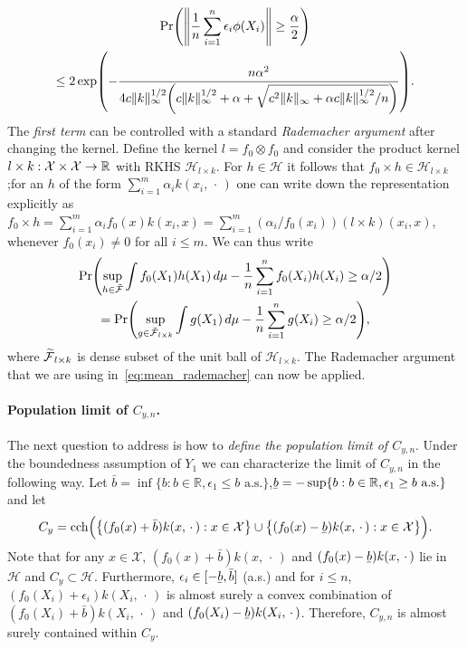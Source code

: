 \documentclass[10pt]{amsart}
\theoremstyle{definition}\newtheorem{defi}[theo]{Definition}\newtheorem{rema}[theo]{Remark}\newtheorem{exam}[theo]{Example}\newtheorem{exem}[theo]{Example}\newtheorem{nota}[theo]{Notation}
\theoremstyle{remark}
\DeclareMathOperator{\cch}{cch}
\newcommand{\R}{\mathbb{R}}
\newcommand{\X}{\mathcal{X}}
\newcommand{\cH}{\mathcal{H}}
\newcommand{\clF}{\mathcal{F}}
\newcommand{\ubar}[1]{\underaccent{\bar}{#1}}
\let\oldtilde\tilde
\renewcommand*{\tilde}[1]{\mathchoice{\widetilde{#1}}{\widetilde{#1}}{\oldtilde{#1}}{\oldtilde{#1}}}
\renewcommand*{\to}{\mathchoice{\longrightarrow}{\rightarrow}{\rightarrow}{\rightarrow}}
\let\originalleft\left
\let\originalright\right
\renewcommand{\left}{\mathopen{}\mathclose\bgroup\originalleft}
\renewcommand{\right}{\aftergroup\egroup\originalright}
\begin{document}
\begin{multline}\label{eq:bernstein_phi}
\Pr\left(\left \| \frac{1}{n} \sum_{i=1}^n \epsilon_i \phi(X_i) \right\|
\geq \frac{\alpha}{2} \right)\\ \leq 2 \exp\left(-\frac{n \alpha^2}{4 c \|k\|^{1/2}_\infty \left(c \|k\|^{1/2}_\infty +\alpha + \sqrt{c^2 \|k\|_\infty + \alpha c \|k\|^{1/2}_\infty /n}\right)}
\right).
\end{multline}
The \emph{first term} can be controlled with a standard \emph{Rademacher argument} after changing the kernel. Define the kernel $l = f_0 \otimes f_0$ and consider the product kernel $l \times k : \X \times \X \to \R$ with RKHS $\cH_{l \times k}$. For $h\in \cH$ it follows that $f_0 \times h \in \cH_{l \times k}$;\linebreak for an $h$ of the form $\sum_{i=1}^m \alpha_i k(x_i,\,\cdot\,)$ one can write down the representation explicitly as $f_0 \times h = \sum_{i=1}^m \alpha_i f_0(x) k(x_i,x) = \sum_{i=1}^m (\alpha_i/f_0(x_i)) (l \times k)(x_i,x)$, whenever $f_0(x_i) \not = 0$ for all $i\leq m$. We can thus write
\begin{multline}\label{eq:mean_y_n_vs_y_second}
\Pr\left(\sup_{h \in \tilde{\clF}} \int f_0(X_1) h(X_1) \, d\mu - \frac{1}{n} \sum_{i=1}^n f_0(X_i) h(X_i) \geq \alpha/2\right)\\
= \Pr\left(\sup_{g \in \tilde{\clF}_{l\times k}} \int g(X_1) \, d\mu - \frac{1}{n} \sum_{i=1}^n g(X_i) \geq \alpha/2\right),
\end{multline}
where $\tilde{\clF}_{l\times k}$ is dense subset of the unit ball of $\cH_{l \times k}$. The Rademacher argument that we are using in~\eqref{eq:mean_rademacher} can now be applied.


\paragraph{Population limit of $C_{y,n}$.} The next question to address is how to \emph{define the population limit of $C_{y,n}$}. Under the boundedness assumption of $Y_1$ we can characterize the limit of $C_{y,n}$ in the following way. Let $\bar b = \inf\{b : b \in \R, \epsilon_1 \leq b \text{ a.s.} \}$,\linebreak $\ubar{b} = - \sup\{b : b \in \R, \epsilon_1 \geq b \text{ a.s.} \}$ and let
\[
C_y = \cch\Bigl(\bigl\{ (f_0(x) + \bar b) k(x,\,\cdot\,) : x \in \X \bigr\} \cup \bigl\{ (f_0(x) - \ubar b) k(x,\,\cdot\,) : x \in \X \bigr\}\Bigr).
\]
Note that for any $x\in \X$, $(f_0(x) + \bar b) k(x,\,\cdot\,)$ and $(f_0(x) - \ubar{b}) k(x,\,\cdot\,)$ lie in $\cH$ and $C_y \subset \cH$. Furthermore, $\epsilon_i \in [-\ubar{b},\bar b]$ (a.s.) and for $i\leq n$, $(f_0(X_i) + \epsilon_i) k(X_i,\,\cdot\,)$ is almost surely a convex combination of $(f_0(X_i) + \bar b) k(X_i,\,\cdot\,)$ and $(f_0(X_i) - \ubar{b}) k(X_i,\,\cdot\,)$. Therefore, $C_{y,n}$ is almost surely contained within $C_y$.
\end{document}

